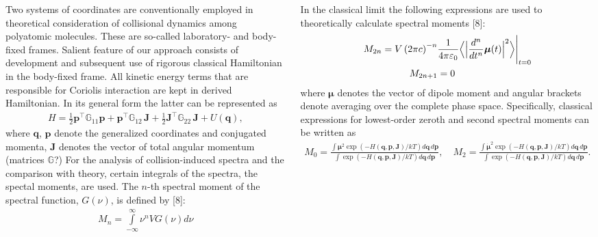\documentclass[
  20pt,
  a0paper,
  portrait,
  margin=0mm,
  innermargin=15mm,
  blockverticalspace=0mm,
  colspace=0mm,
  subcolspace=0mm
]{tikzposter}
\newcommand{\mf}{\mathbf}
\newcommand{\lb}{\left(}
\newcommand{\rb}{\right)}
\newcommand{\bbG}{\mathbb{G}}
\newcommand{\vpravo}{\hspace{1.5cm}}
\newcommand{\vverh}{\vspace*{-0.05cm}}
\begin{document}
\begin{columns}
{{\vpravo Two systems of coordinates are conventionally employed in theoretical consideration of collisional dynamics among polyatomic molecules. These are so-called laboratory- and body-fixed frames. Salient feature of our approach consists of development and subsequent use of rigorous classical Hamiltonian in the body-fixed frame. All kinetic energy terms that are responsible for Coriolis interaction are kept in derived Hamiltonian. In its general form the latter can be represented as  
\vverh
\begin{gather}
		H = \frac{1}{2} \mf{p}^\top \bbG_{11} \mf{p} + \mf{p}^\top \bbG_{12} \, \mf{J} + \frac{1}{2} \mf{J}^\top \bbG_{22} \, \mf{J} + U(\mf{q}), \label{eq:hamiltonian}
\end{gather}
where $\mf{q}$, $\mf{p}$ denote the generalized coordinates and conjugated momenta, $\mf{J}$ denotes the vector of total angular momentum (matrices $\bbG$?)   
For the analysis of collision-induced spectra and the comparison with theory, certain integrals of the spectra, the spectal moments, are used. The $n$-th spectral moment of the spectral function, $G(\nu)$, is defined by [8]: 
\vverh
\begin{gather}
		M_n = \int\limits_{-\infty}^{\infty} \nu^n V G(\nu) d \nu \label{eq:gen_moment} 
\end{gather}

In the classical limit the following expressions are used to theoretically calculate spectral moments [8]:
\vspace*{-0.6cm}
\begin{gather}
\begin{aligned}
		M_{2n} = V \lb 2 \pi c \rb^{-n} & \frac{1}{4 \pi \varepsilon_0} \Big\langle \Big{|} \frac{d^n}{dt^n} \boldsymbol{\mu}(t) \Big{|}^2 \Big\rangle \Bigg{|}_{t = 0} \\
M_{2n + 1} &= 0
\end{aligned}
\label{eq:classical_moment}
\end{gather}
where $\boldsymbol{\mu}$ denotes the vector of dipole moment and angular brackets denote averaging over the complete phase space. Specifically, classical expressions for lowest-order zeroth and second spectral moments can be written as
\begin{gather}
		M_0 = \displaystyle \frac{\int \boldsymbol{\mu}^2 \exp \lb -H \lb \mf{q}, \mf{p}, \mf{J} \rb / k T \rb d \mf{q} \, d \mf{p}}{\int \exp \lb - H \lb \mf{q}, \mf{p}, \mf{J} \rb / k T \rb d \mf{q} \, d \mf{p}}, \quad M_2 = \displaystyle \frac{\int \boldsymbol{\dot{\mu}}^2 \exp \lb -H \lb \mf{q}, \mf{p}, \mf{J} \rb / k T \rb d \mf{q} \, d \mf{p}}{\int \exp \lb - H \lb \mf{q}, \mf{p}, \mf{J} \rb / k T \rb d \mf{q} \, d \mf{p}}. \label{eq:m0_and_m2} 
\end{gather}

}}
\end{columns}
\end{document}
